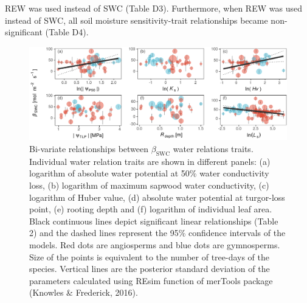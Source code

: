 \documentclass[11pt,twoside]{reedthesis}
\begin{document}
REW was used instead of SWC (Table D3). Furthermore, when REW was used
instead of SWC, all soil moisture sensitivity-trait relationships became
non-significant (Table D4).\par
\begin{figure}[hbt!]

{\centering \includegraphics[width=1\linewidth]{figure/CH5/Figure_5} 

}

\caption[Bi-variate relationships between $\beta_{\text{SWC}}$ water relations traits.]{Bi-variate relationships between $\beta_{\text{SWC}}$ water relations traits. Individual water relation traits are shown in different panels: (a) logarithm of absolute water potential at 50\% water conductivity loss, (b) logarithm of maximum sapwood water conductivity, (c) logarithm of Huber value, (d) absolute water potential at turgor-loss point, (e) rooting depth and (f) logarithm of individual leaf area. Black continuous lines depict significant linear relationships (Table 2) and the dashed lines represent the 95\% confidence intervals of the models. Red dots are angiosperms and blue dots are gymnosperms. Size of the points is equivalent to the number of tree-days of the species. Vertical lines are the posterior standard deviation of the parameters calculated using REsim function of merTools package (Knowles \& Frederick, 2016).}\label{fig:ch5fig5}
\end{figure}
\end{document}
